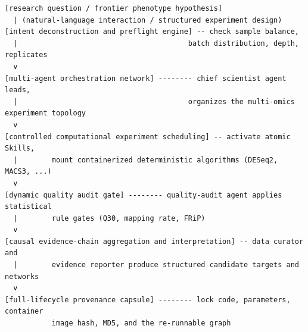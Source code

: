 \documentclass[11pt,a4paper]{article}
\begin{document}
\begin{verbatim}
[research question / frontier phenotype hypothesis]
  | (natural-language interaction / structured experiment design)
[intent deconstruction and preflight engine] -- check sample balance,
  |                                        batch distribution, depth, replicates
  v
[multi-agent orchestration network] -------- chief scientist agent leads,
  |                                        organizes the multi-omics experiment topology
  v
[controlled computational experiment scheduling] -- activate atomic Skills,
  |        mount containerized deterministic algorithms (DESeq2, MACS3, ...)
  v
[dynamic quality audit gate] -------- quality-audit agent applies statistical
  |        rule gates (Q30, mapping rate, FRiP)
  v
[causal evidence-chain aggregation and interpretation] -- data curator and
  |        evidence reporter produce structured candidate targets and networks
  v
[full-lifecycle provenance capsule] -------- lock code, parameters, container
           image hash, MD5, and the re-runnable graph
\end{verbatim}
\end{document}
